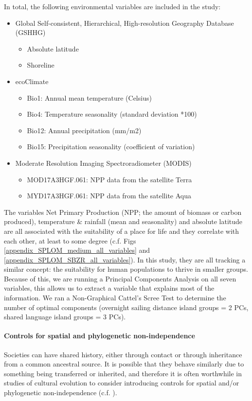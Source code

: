 \documentclass[unnumsec,webpdf,modern,medium]{oup-authoring-template}
\begin{document}
In total, the following environmental variables are included in the study:

\begin{itemize}
\item Global Self-consistent, Hierarchical, High-resolution Geography Database (GSHHG)
\begin{itemize}
    \item Absolute latitude
    \item Shoreline
\end{itemize}
\item ecoClimate
\begin{itemize}
\item Bio1: Annual mean temperature (Celsius)
\item Bio4: Temperature seasonality (standard deviation *100)
\item Bio12: Annual precipitation (mm/m2)
\item Bio15: Precipitation seasonality (coefficient of variation)
\end{itemize}
\item Moderate Resolution Imaging Spectroradiometer (MODIS)
\begin{itemize}
    \item MOD17A3HGF.061: NPP data from the satellite Terra
    \item MYD17A3HGF.061: NPP data from the satellite Aqua
\end{itemize}
\end{itemize}

The variables Net Primary Production (NPP; the amount of biomass or carbon produced), temperature \& rainfall (mean and seasonality) and absolute latitude are all associated with the suitability of a place for life and they correlate with each other, at least to some degree (c.f. Figs \ref{appendix_SPLOM_medium_all_variables} and \ref{appendix_SPLOM_SBZR_all_variables}). In this study, they are all tracking a similar concept: the suitability for human populations to thrive in smaller groups. Because of this, we are running a Principal Components Analysis on all seven variables, this allows us to extract a variable that explains most of the information. We ran a Non-Graphical Cattel's Scree Test \citep{cattell1966scree, R-nFactors} to determine the number of optimal components (overnight sailing distance island groups = 2 PCs, shared language island groups = 3 PCs).
\FloatBarrier


\FloatBarrier
\paragraph{Controls for spatial and phylogenetic non-independence} 
\label{appendix_sp_control}
Societies can have shared history, either through contact or through inheritance from a common ancestral source. It is possible that they behave similarly due to something being transferred or inherited, and therefore it is often worthwhile in studies of cultural evolution to consider introducing controls for spatial and/or phylogenetic non-independence (c.f. \citet{gavin2013toward}).
\end{document}
